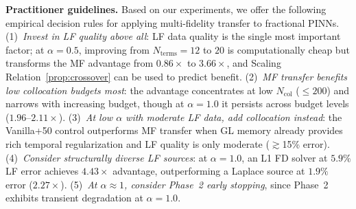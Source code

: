 \documentclass[11pt]{article}
\newcommand{\Ncol}{N_{\mathrm{col}}}
\begin{document}
\textbf{Practitioner guidelines.} Based on our experiments, we offer the following empirical decision rules for applying multi-fidelity transfer to fractional PINNs. (1)~\emph{Invest in LF quality above all}: LF data quality is the single most important factor; at $\alpha = 0.5$, improving from $N_{\mathrm{terms}} = 12$ to $20$ is computationally cheap but transforms the MF advantage from $0.86\times$ to $3.66\times$, and Scaling Relation~\ref{prop:crossover} can be used to predict benefit. (2)~\emph{MF transfer benefits low collocation budgets most}: the advantage concentrates at low $\Ncol$ ($\leq 200$) and narrows with increasing budget, though at $\alpha = 1.0$ it persists across budget levels ($1.96$--$2.11\times$). (3)~\emph{At low $\alpha$ with moderate LF data, add collocation instead}: the Vanilla+50 control outperforms MF transfer when GL memory already provides rich temporal regularization and LF quality is only moderate ($\gtrsim$15\% error). (4)~\emph{Consider structurally diverse LF sources}: at $\alpha = 1.0$, an L1 FD solver at $5.9\%$ LF error achieves $4.43\times$ advantage, outperforming a Laplace source at $1.9\%$ error ($2.27\times$). (5)~\emph{At $\alpha \approx 1$, consider Phase~2 early stopping}, since Phase~2 exhibits transient degradation at $\alpha = 1.0$.
\end{document}

